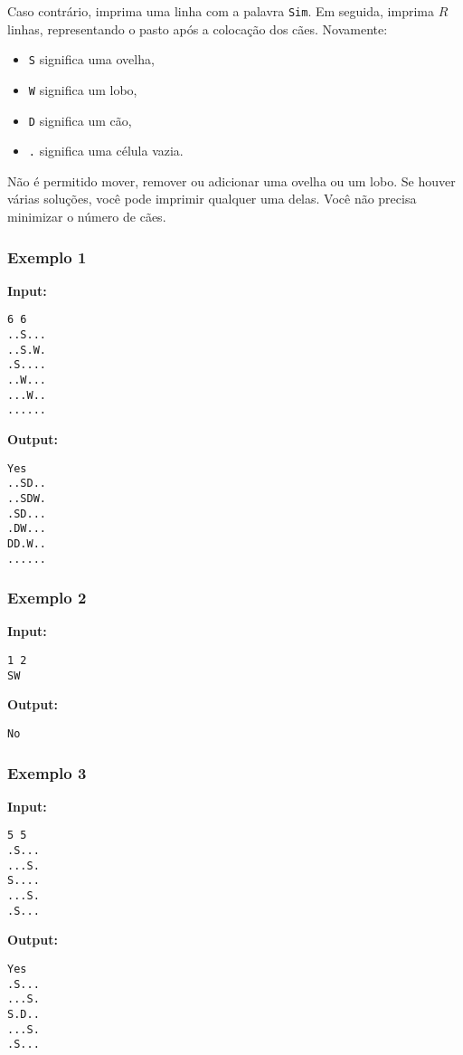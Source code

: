 Caso contrário, imprima uma linha com a palavra \texttt{Sim}. Em seguida, imprima \( R \) linhas, representando o pasto após a colocação dos cães. Novamente:
\begin{itemize}
    \item \texttt{S} significa uma ovelha,
    \item \texttt{W} significa um lobo,
    \item \texttt{D} significa um cão,
    \item \texttt{.} significa uma célula vazia.
\end{itemize}

Não é permitido mover, remover ou adicionar uma ovelha ou um lobo. Se houver várias soluções, você pode imprimir qualquer uma delas. Você não precisa minimizar o número de cães.

\subsubsection*{Exemplo 1}

\textbf{Input:}
\begin{verbatim}
6 6
..S...
..S.W.
.S....
..W...
...W..
......
\end{verbatim}

\textbf{Output:}
\begin{verbatim}
Yes
..SD..
..SDW.
.SD...
.DW...
DD.W..
......
\end{verbatim}

\subsubsection*{Exemplo 2}

\textbf{Input:}
\begin{verbatim}
1 2
SW
\end{verbatim}

\textbf{Output:}
\begin{verbatim}
No
\end{verbatim}

\subsubsection*{Exemplo 3}

\textbf{Input:}
\begin{verbatim}
5 5
.S...
...S.
S....
...S.
.S...
\end{verbatim}

\textbf{Output:}
\begin{verbatim}
Yes
.S...
...S.
S.D..
...S.
.S...
\end{verbatim}

